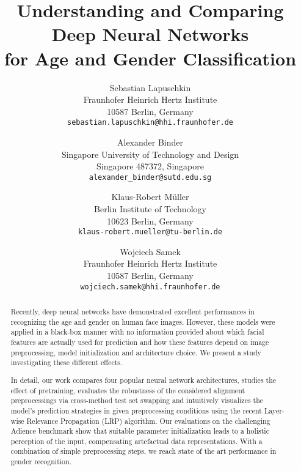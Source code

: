 \documentclass[10pt,twocolumn,letterpaper]{article}
\begin{document}
\title{Understanding and Comparing Deep Neural Networks\\ for Age and Gender Classification}

\author{Sebastian Lapuschkin\\
Fraunhofer Heinrich Hertz Institute\\
10587 Berlin, Germany\\
{\tt\small sebastian.lapuschkin@hhi.fraunhofer.de}
%
\and
Alexander Binder\\
Singapore University of Technology and Design\\
Singapore 487372, Singapore\\
{\tt\small alexander\_binder@sutd.edu.sg}
%
\and
Klaus-Robert Müller\\
Berlin Institute of Technology\\
10623 Berlin, Germany\\
{\tt\small klaus-robert.mueller@tu-berlin.de}
%
\and
Wojciech Samek\\
Fraunhofer Heinrich Hertz Institute\\
10587 Berlin, Germany\\
{\tt\small wojciech.samek@hhi.fraunhofer.de}
}
\maketitle
\thispagestyle{empty}


\begin{abstract}
Recently, deep neural networks have demonstrated excellent performances in recognizing the age and gender on human face images.
However, these models were applied in a black-box manner with no information provided about which facial features are actually used for prediction 
and how these features depend on image preprocessing, model initialization and architecture choice.
We present a study investigating these different effects.

In detail, our work compares four popular neural network architectures, studies the effect of pretraining, evaluates the robustness of the considered alignment preprocessings via cross-method test set swapping and intuitively visualizes the model's prediction strategies in given preprocessing conditions using the recent Layer-wise Relevance Propagation (LRP) algorithm. 
Our evaluations on the challenging Adience benchmark show that suitable parameter initialization leads to a holistic perception of the input, compensating artefactual data representations. With a combination of simple preprocessing steps, we reach state of the art performance in gender recognition.



\end{abstract}
\end{document}
